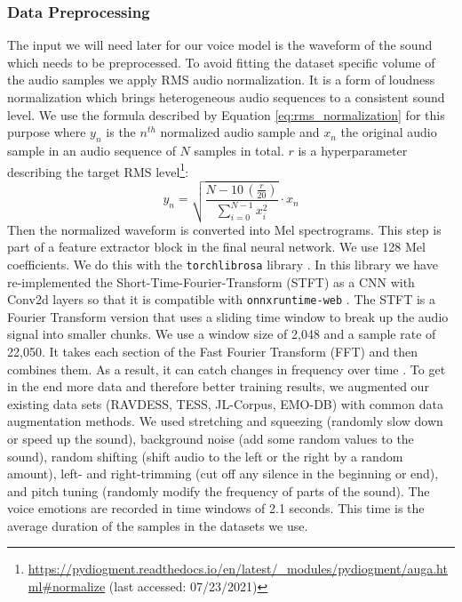 \subsubsection{Data Preprocessing}
\label{subsubsec:method_vocal_emotion_recognition_data_preprocessing}
The input we will need later for our voice model is the waveform of the sound which needs to be preprocessed. To avoid fitting the dataset specific volume of the audio samples we apply RMS audio normalization. It is a form of loudness normalization which brings heterogeneous audio sequences to a consistent sound level. We use the formula described by Equation \ref{eq:rms_normalization} for this purpose where $y_n$ is the $n^{th}$ normalized audio sample and $x_n$ the original audio sample in an audio sequence of $N$ samples in total. $r$ is a hyperparameter describing the target RMS level\footnote{\url{https://pydiogment.readthedocs.io/en/latest/_modules/pydiogment/auga.html#normalize} (last accessed: 07/23/2021)}:
\begin{equation}
\label{eq:rms_normalization}
y_n=\sqrt{\frac{N-10\,(\frac{r}{20})}{\sum_{i=0}^{N-1}{x_i^2}}}\cdot{}x_n
\end{equation}
Then the normalized waveform is converted into Mel spectrograms. This step is part of a feature extractor block in the final neural network. We use 128 Mel coefficients. We do this with the \texttt{torchlibrosa} library \cite{kong_panns_2020}. In this library we have re-implemented the Short-Time-Fourier-Transform (STFT) as a CNN with Conv2d layers so that it is compatible with \texttt{onnxruntime-web} \cite{onnx_runtime_developers_onnx_2021}. The STFT is a Fourier Transform version that uses a sliding time window to break up the audio signal into smaller chunks. We use a window size of 2,048 and a sample rate of 22,050. It takes each section of the Fast Fourier Transform (FFT) and then combines them. As a result, it can catch changes in frequency over time \cite{griffin_signal_1984}. To get in the end more data and therefore better training results, we augmented our existing data sets (RAVDESS, TESS, JL-Corpus, EMO-DB) with common data augmentation methods. We used stretching and squeezing (randomly slow down or speed up the sound), background noise (add some random values to the sound), random shifting (shift audio to the left or the right by a random amount), left- and right-trimming (cut off any silence in the beginning or end), and pitch tuning (randomly modify the frequency of parts of the sound)\cite{mcfee_librosa_2015}. The voice emotions are recorded in time windows of 2.1 seconds. This time is the average duration of the samples in the datasets we use.

